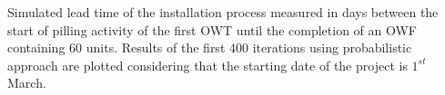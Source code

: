 \label{fig:iterations}
Simulated lead time of the installation process measured in days between the start of pilling activity of the first OWT until the completion of an OWF containing 60 units. Results of the first 400 iterations using probabilistic approach are plotted considering that the starting date of the project is $1^{st}$ March.